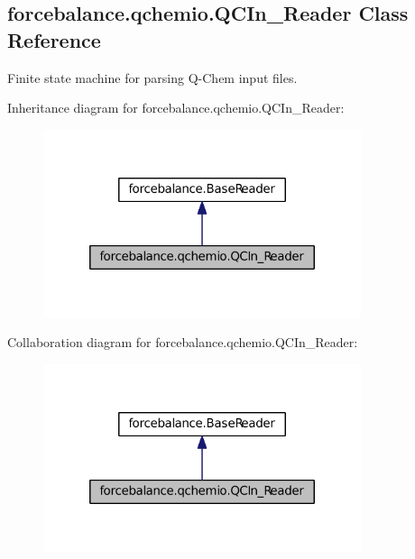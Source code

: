 \hypertarget{classforcebalance_1_1qchemio_1_1QCIn__Reader}{\subsection{forcebalance.\-qchemio.\-Q\-C\-In\-\_\-\-Reader \-Class \-Reference}
\label{classforcebalance_1_1qchemio_1_1QCIn__Reader}
}


\-Finite state machine for parsing \-Q-\/\-Chem input files.  




\-Inheritance diagram for forcebalance.\-qchemio.\-Q\-C\-In\-\_\-\-Reader\-:\nopagebreak
\begin{figure}[H]
\begin{center}
\leavevmode
\includegraphics[width=264pt]{classforcebalance_1_1qchemio_1_1QCIn__Reader__inherit__graph}
\end{center}
\end{figure}


\-Collaboration diagram for forcebalance.\-qchemio.\-Q\-C\-In\-\_\-\-Reader\-:\nopagebreak
\begin{figure}[H]
\begin{center}
\leavevmode
\includegraphics[width=264pt]{classforcebalance_1_1qchemio_1_1QCIn__Reader__coll__graph}
\end{center}
\end{figure}
